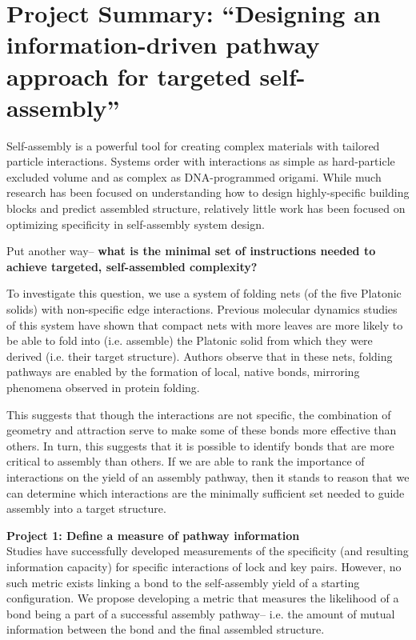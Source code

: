 \thispagestyle{empty}
\section*{Project Summary: ``Designing an information-driven pathway approach for targeted self-assembly''}


Self-assembly is a powerful tool for creating complex materials with tailored particle interactions.
Systems order with interactions as simple as hard-particle excluded volume and as complex as DNA-programmed origami. 
While much research has been focused on understanding how to design highly-specific building blocks and predict assembled structure, relatively little work has been focused on optimizing specificity in self-assembly system design.

Put another way-- 
\textbf{what is the minimal set of instructions needed to achieve targeted, self-assembled complexity?}

To investigate this question, we use a system of folding nets (of the five Platonic solids) with non-specific edge interactions.
Previous molecular dynamics studies of this system have shown that compact nets with more leaves are more likely to be able to fold into (i.e. assemble) the Platonic solid from which they were derived (i.e. their target structure).   
Authors observe that in these nets, folding pathways are enabled by the formation of local, native bonds, mirroring phenomena observed in protein folding.

This suggests that though the interactions are not specific, the combination of geometry and attraction serve to make some of these bonds more effective than others.
In turn, this suggests that it is possible to identify bonds that are more critical to assembly than others. 
If we are able to rank the importance of interactions on the yield of an assembly pathway, then it stands to reason that we can determine which interactions are the minimally sufficient set needed to guide assembly into a target structure. 

\textbf{Project 1: Define a measure of pathway information}\\
Studies have successfully developed measurements of the specificity (and resulting information capacity) for specific interactions of lock and key pairs.
However, no such metric exists linking a bond to the self-assembly yield of a starting configuration.
We propose developing a metric that measures the likelihood of a bond being a part of a successful assembly pathway-- i.e. the amount of mutual information between the bond and the final assembled structure.

